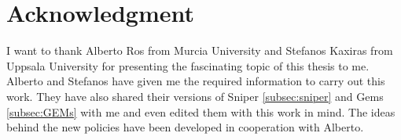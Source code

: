 \chapter*{Acknowledgment}
I want to thank Alberto Ros from Murcia University and Stefanos Kaxiras from
Uppsala University for presenting the fascinating topic of this thesis to me. Alberto
and Stefanos have given me the required information to carry out this work. They have also shared their versions of Sniper \ref{subsec:sniper} and Gems \ref{subsec:GEMs} with me and even edited them with this work in mind. The ideas behind the new policies have been developed in cooperation with Alberto.
\newpage